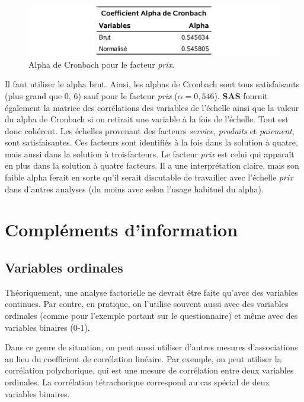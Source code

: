 \documentclass[
  11pt,
  letterpaper,
]{book}
\theoremstyle{definition}
\theoremstyle{definition}
\theoremstyle{definition}
\theoremstyle{remark}
\begin{document}
\begin{figure}

{\centering \includegraphics[width=0.85\linewidth]{figures/01-facto-e11} 

}

\caption{Alpha de Cronbach pour le facteur \emph{prix}.}\label{fig:fig1p11}
\end{figure}

Il faut utiliser le alpha brut. Ainsi, les alphas de Cronbach sont tous
satisfaisants (plus grand que 0, 6) sauf pour le facteur \emph{prix} (\(\alpha=0, 546\)). \textbf{SAS} fournit également la matrice des corrélations des variables de l'échelle ainsi que la valeur du alpha de Cronbach si on retirait une variable à la fois de l'échelle. Tout est donc cohérent. Les échelles provenant des facteurs \emph{service}, \emph{produits} et \emph{paiement}, sont satisfaisantes. Ces facteurs sont identifiés à la fois dans la solution à quatre, mais aussi dans la solution à troisfacteurs. Le facteur \emph{prix} est celui qui apparaît en plus dans la solution à quatre facteurs. Il a une interprétation claire, mais son faible alpha ferait en sorte qu'il serait discutable de travailler avec l'échelle \emph{prix} dans d'autres analyses (du moins avec selon l'usage habituel du alpha).

\hypertarget{compluxe9ments-dinformation}{%
\section{Compléments d'information}\label{compluxe9ments-dinformation}}

\hypertarget{variables-ordinales}{%
\subsection{Variables ordinales}\label{variables-ordinales}}

Théoriquement, une analyse factorielle ne devrait être faite qu'avec des
variables continues. Par contre, en pratique, on l'utilise souvent aussi avec des variables ordinales (comme pour l'exemple portant sur le questionnaire) et même avec des variables binaires (0-1).

Dans ce genre de situation, on peut aussi utiliser d'autres mesures d'associations au lieu du coefficient de corrélation linéaire. Par exemple, on peut utiliser la corrélation polychorique, qui est une mesure de corrélation entre deux variables ordinales. La corrélation tétrachorique correspond au cas spécial de deux variables binaires.
\end{document}

